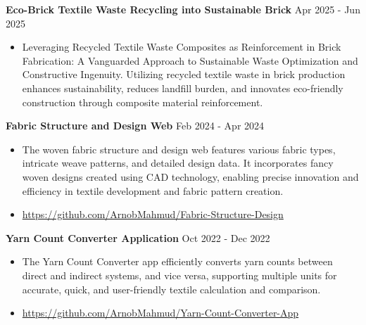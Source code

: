 

{\textbf{Eco-Brick \textbar Textile Waste Recycling into Sustainable Brick}} \hfill Apr 2025 - Jun 2025\\

\begin{itemize}
\item 
\vspace{-2mm}
\begin{justify}Leveraging Recycled Textile Waste Composites as Reinforcement in Brick Fabrication: A Vanguarded Approach to Sustainable Waste Optimization and Constructive Ingenuity. Utilizing recycled textile waste in brick production enhances sustainability, reduces landfill burden, and innovates eco-friendly construction through composite material reinforcement.
\end{justify}
\end{itemize}

{\textbf{Fabric Structure and Design Web}} \hfill  Feb 2024 - Apr 2024\\
\begin{itemize}
\vspace{-2mm}
    \item 
    \begin{justify}The woven fabric structure and design web features various fabric types, intricate weave patterns, and detailed design data. It incorporates fancy woven designs created using CAD technology, enabling precise innovation and efficiency in textile development and fabric pattern creation.
    \end{justify}
\vspace{-2mm}
    \item \href{https://github.com/ArnobMahmud/Fabric-Structure-Design}{https://github.com/ArnobMahmud/Fabric-Structure-Design}
\end{itemize}

{\textbf{Yarn Count Converter Application}} \hfill Oct 2022 - Dec 2022\\
\begin{itemize}
\item  
\vspace{-2mm}
\begin{justify}The Yarn Count Converter app efficiently converts yarn counts between direct and indirect systems,
 and vice versa, supporting multiple units for accurate, quick, and user-friendly textile calculation and comparison.
 \end{justify}
 \item 
\vspace{-2mm} 
\href{https://github.com/ArnobMahmud/Yarn-Count-Converter-App}{https://github.com/ArnobMahmud/Yarn-Count-Converter-App}

\end{itemize}
